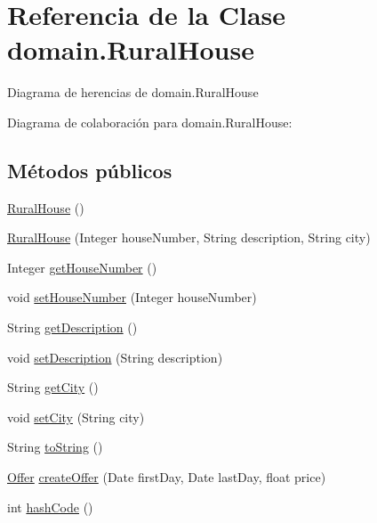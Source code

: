 \hypertarget{classdomain_1_1_rural_house}{}\section{Referencia de la Clase domain.\+Rural\+House}
\label{classdomain_1_1_rural_house}


Diagrama de herencias de domain.\+Rural\+House


Diagrama de colaboración para domain.\+Rural\+House\+:
\subsection*{Métodos públicos}
\begin{DoxyCompactItemize}
\item 
\mbox{\hyperlink{classdomain_1_1_rural_house_a5e1f42ad6b3992bfc5fdece628455552}{Rural\+House}} ()
\item 
\mbox{\hyperlink{classdomain_1_1_rural_house_aed816133d8047632fa70f3f83758274d}{Rural\+House}} (Integer house\+Number, String description, String city)
\item 
Integer \mbox{\hyperlink{classdomain_1_1_rural_house_a849faba68dc8c0a71ed936bc509f5568}{get\+House\+Number}} ()
\item 
void \mbox{\hyperlink{classdomain_1_1_rural_house_afae7f7702581e18517472b1faa29273d}{set\+House\+Number}} (Integer house\+Number)
\item 
String \mbox{\hyperlink{classdomain_1_1_rural_house_a21b3359aa62984046a4da490fe8895e1}{get\+Description}} ()
\item 
void \mbox{\hyperlink{classdomain_1_1_rural_house_aff9ad2c8f775b473256233e9c26456f1}{set\+Description}} (String description)
\item 
String \mbox{\hyperlink{classdomain_1_1_rural_house_a67a45aa0b441b32d455d58c4a42446f1}{get\+City}} ()
\item 
void \mbox{\hyperlink{classdomain_1_1_rural_house_a04f87e3266ab2b0d9b42bb8f947d6172}{set\+City}} (String city)
\item 
String \mbox{\hyperlink{classdomain_1_1_rural_house_a2937650ac9e726b75be724d264fa1bee}{to\+String}} ()
\item 
\mbox{\hyperlink{classdomain_1_1_offer}{Offer}} \mbox{\hyperlink{classdomain_1_1_rural_house_a58e17e08a7b28a75bc1b8e3d6ac01764}{create\+Offer}} (Date first\+Day, Date last\+Day, float price)
\item 
int \mbox{\hyperlink{classdomain_1_1_rural_house_a23272d170821f464d6b07595303c283e}{hash\+Code}} ()

\end{DoxyCompactItemize}
